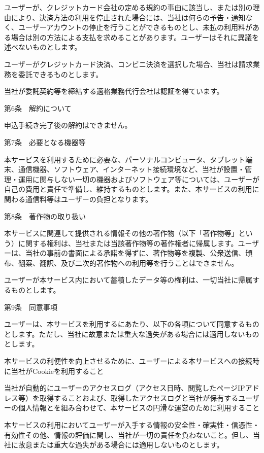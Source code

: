     ユーザーが、クレジットカード会社の定める規約の事由に該当し、または別の理由により、決済方法の利用を停止された場合には、当社は何らの予告・通知なく、ユーザーアカウントの停止を行うことができるものとし、未払の利用料がある場合は別の方法による支払を求めることがあります。ユーザーはそれに異議を述べないものとします。

    ユーザーがクレジットカード決済、コンビニ決済を選択した場合、当社は請求業務を委託できるものとします。

    当社が委託契約等を締結する適格業務代行会社は認証を得ています。

第6条　解約について

    申込手続き完了後の解約はできません。

第7条　必要となる機器等

    本サービスを利用するために必要な、パーソナルコンピュータ、タブレット端末、通信機器、ソフトウェア、インターネット接続環境など、当社が設置・管理・運用に関与しない一切の機器およびソフトウェア等については、ユーザーが自己の費用と責任で準備し、維持するものとします。また、本サービスの利用に関わる通信料等はユーザーの負担となります。

第8条　著作物の取り扱い

    本サービスに関連して提供される情報その他の著作物（以下「著作物等」という）に関する権利は、当社または当該著作物等の著作権者に帰属します。ユーザーは、当社の事前の書面による承諾を得ずに、著作物等を複製、公衆送信、頒布、翻案、翻訳、及び二次的著作物への利用等を行うことはできません。

    ユーザーが本サービス内において蓄積したデータ等の権利は、一切当社に帰属するものとします。

第9条　同意事項

    ユーザーは、本サービスを利用するにあたり、以下の各項について同意するものとします。ただし、当社に故意または重大な過失がある場合には適用しないものとします。

    本サービスの利便性を向上させるために、ユーザーによる本サービスへの接続時に当社がCookieを利用すること

    当社が自動的にユーザーのアクセスログ（アクセス日時、閲覧したページIPアドレス等）を取得することおよび、取得したアクセスログと当社が保有するユーザーの個人情報とを組み合わせて、本サービスの円滑な運営のために利用すること

    本サービスの利用においてユーザーが入手する情報の安全性・確実性・信憑性・有効性その他、情報の評価に関し、当社が一切の責任を負わないこと。但し、当社に故意または重大な過失がある場合には適用しないものとします。

